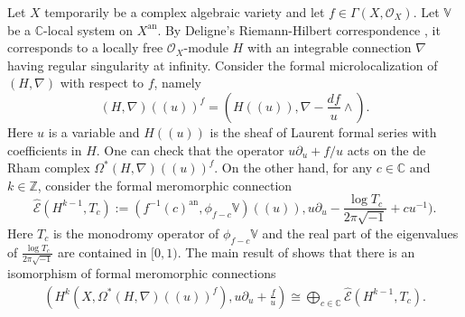\documentclass[12pt, a4paper]{article}
\begin{document}
Let $X$ temporarily be a complex algebraic variety and let $f\in\Gamma(X,\mathcal O_X)$. Let $\mathbb V$ be a $\mathbb C$-local system on $X^\mathrm{an}$. By Deligne's Riemann-Hilbert correspondence \cite{Del}, it corresponds to a locally free $\mathcal O_X$-module $H$ with an integrable connection $\nabla$ having regular singularity at infinity. Consider the formal microlocalization of $(H,\nabla)$ with respect to $f$, namely
$$
(H,\nabla)((u))^f=(H((u)),\nabla-\frac{df}{u}\wedge).
$$
Here $u$ is a variable and $H((u))$ is the sheaf of Laurent formal series with coefficients in $H$. One can check that the operator $u\partial_u+f/u$ acts on the de Rham complex $\Omega^*(H,\nabla)((u))^f$. On the other hand, for any $c\in\mathbb C$ and $k\in\mathbb Z$, consider the formal meromorphic connection
$$
\hat{\mathcal E}(H^{k-1},T_c):=(f^{-1}(c)^\mathrm{an},\phi_{f-c}\mathbb V)((u)),u\partial_u-\frac{\log T_c}{2\pi\sqrt{-1}}+cu^{-1}).
$$
Here $T_c$ is the monodromy operator of $\phi_{f-c}\mathbb V$ and the real part of the eigenvalues of $\frac{\log T_c}{2\pi\sqrt{-1}}$ are contained in $[0,1)$. The main result of \cite{SS} shows that there is an isomorphism of formal meromorphic connections
\begin{eqnarray}\label{SS}
(H^k(X,\Omega^*(H,\nabla)((u))^f),u\partial_u+\frac{f}{u})\cong\bigoplus_{c\in\mathbb C}\hat{\mathcal E}(H^{k-1},T_c).\end{eqnarray}
\end{document}
